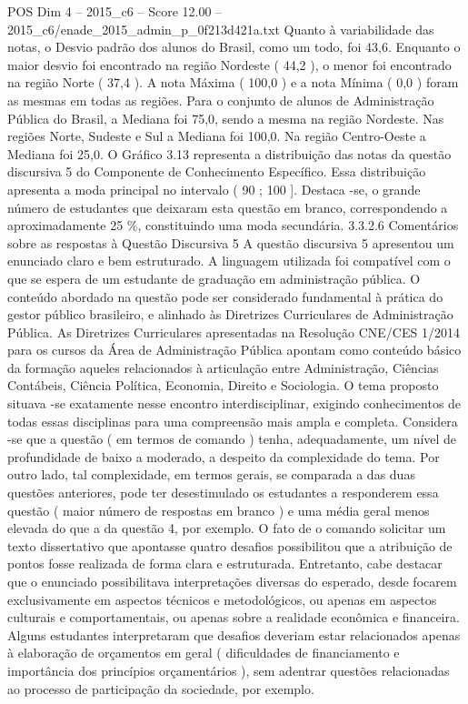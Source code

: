 \begin{textsample}{POS Dim 4 – 2015\_c6 – Score 12.00 – 2015\_c6/enade\_2015\_admin\_p\_0f213d421a.txt}
Quanto à variabilidade das notas, o Desvio padrão dos alunos do Brasil, como um todo, foi 43,6.
Enquanto o maior desvio foi encontrado na região Nordeste ( 44,2 ), o menor foi encontrado na região Norte ( 37,4 ).
A nota Máxima ( 100,0 ) e a nota Mínima ( 0,0 ) foram as mesmas em todas as regiões.
Para o conjunto de alunos de Administração Pública do Brasil, a Mediana foi 75,0, sendo a mesma na região Nordeste.
Nas regiões Norte, Sudeste e Sul a Mediana foi 100,0.
Na região Centro-Oeste a Mediana foi 25,0.
O Gráfico 3.13 representa a distribuição das notas da questão discursiva 5 do Componente de Conhecimento Específico.
Essa distribuição apresenta a moda principal no intervalo ( 90 ; 100 ].
Destaca -se, o grande número de estudantes que deixaram esta questão em branco, correspondendo a aproximadamente 25 \%, constituindo uma moda secundária. 3.3.2.6 Comentários sobre as respostas à Questão Discursiva 5 A questão discursiva 5 apresentou um enunciado claro e bem estruturado.
A linguagem utilizada foi compatível com o que se espera de um estudante de graduação em administração pública.
O conteúdo abordado na questão pode ser considerado fundamental à prática do gestor público brasileiro, e alinhado às Diretrizes Curriculares de Administração Pública.
As Diretrizes Curriculares apresentadas na Resolução CNE/CES 1/2014 para os cursos da Área de Administração Pública apontam como conteúdo básico da formação aqueles relacionados à articulação entre Administração, Ciências Contábeis, Ciência Política, Economia, Direito e Sociologia.
O tema proposto situava -se exatamente nesse encontro interdisciplinar, exigindo conhecimentos de todas essas disciplinas para uma compreensão mais ampla e completa.
Considera -se que a questão ( em termos de comando ) tenha, adequadamente, um nível de profundidade de baixo a moderado, a despeito da complexidade do tema.
Por outro lado, tal complexidade, em termos gerais, se comparada a das duas questões anteriores, pode ter desestimulado os estudantes a responderem essa questão ( maior número de respostas em branco ) e uma média geral menos elevada do que a da questão 4, por exemplo.
O fato de o comando solicitar um texto dissertativo que apontasse quatro desafios possibilitou que a atribuição de pontos fosse realizada de forma clara e estruturada.
Entretanto, cabe destacar que o enunciado possibilitava interpretações diversas do esperado, desde focarem exclusivamente em aspectos técnicos e metodológicos, ou apenas em aspectos culturais e comportamentais, ou apenas sobre a realidade econômica e financeira.
Alguns estudantes interpretaram que desafios deveriam estar relacionados apenas à elaboração de orçamentos em geral ( dificuldades de financiamento e importância dos princípios orçamentários ), sem adentrar questões relacionadas ao processo de participação da sociedade, por exemplo.

\end{textsample}
